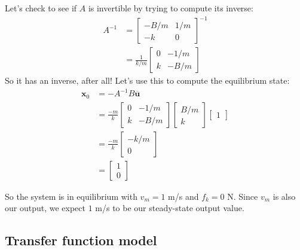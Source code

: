 \documentclass[dynamic_systems.tex]{subfiles}
\begin{document}
Let's check to see if $A$ is invertible by trying to compute its inverse:
\begin{align}
  A^{-1} &= 
	\begin{bmatrix}
		-B/m & 1/m \\
		-k & 0
	\end{bmatrix}^{-1} \\
	&= \frac{1}{k/m}
	\begin{bmatrix}
		0 & -1/m \\
		k & -B/m
	\end{bmatrix}
\end{align}
So it has an inverse, after all! Let's use this to compute the equilibrium state:
\begin{align}
	\bm{x}_0 &= -A^{-1}B\overline{\bm{u}} \\
	&= 
	\frac{-m}{k}
	\begin{bmatrix}
		0 & -1/m \\
		k & -B/m
	\end{bmatrix}
	\begin{bmatrix}
		B/m \\ k
	\end{bmatrix}
	\begin{bmatrix}
		1
	\end{bmatrix} \\
	&= 
	\frac{-m}{k}
	\begin{bmatrix}
		-k/m \\
		0
	\end{bmatrix}\\
	&= 
	\begin{bmatrix}
		1 \\
		0
	\end{bmatrix}
\end{align}

So the system is in equilibrium with $v_m = 1$ m/s and $f_k = 0$ N.
Since $v_m$ is also our output, we expect $1$ m/s to be our steady-state output value.
\tags{}

\subsection{Transfer function model}
\tags{}
\end{document}
